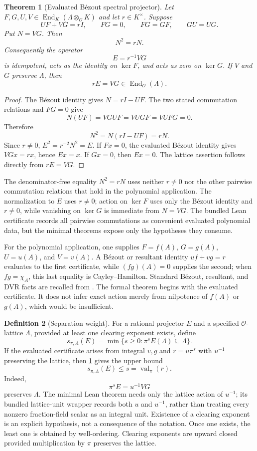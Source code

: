 \documentclass[11pt]{article}
\newtheorem{theorem}{Theorem}[section]
\theoremstyle{definition}
\newtheorem{definition}[theorem]{Definition}
\theoremstyle{remark}
\newcommand{\End}{\operatorname{End}}
\newcommand{\OO}{\mathcal O}
\newcommand{\val}{\operatorname{val}}
\begin{document}
\begin{theorem}[Evaluated B\'ezout spectral projector]\label{thm:bezout-projector}
Let $F,G,U,V\in\End_K(\Lambda\otimes_\OO K)$ and let $r\in K^\times$.
Suppose
\[
UF+VG=rI,
\qquad FG=0,
\qquad FG=GF,
\qquad GU=UG.
\]
Put $N=VG$. Then
\[
\boxed{N^2=rN.}
\]
Consequently the operator
\[
\boxed{
E=r^{-1}VG
}
\]
is idempotent, acts as the identity on $\ker F$, and acts as zero on
$\ker G$. If $V$ and $G$ preserve $\Lambda$, then
\[
rE=VG\in\End_\OO(\Lambda).
\]
\end{theorem}

\begin{proof}
The B\'ezout identity gives $N=rI-UF$. The two stated commutation relations
and $FG=0$ give
\[
N(UF)=VGUF=VUGF=VUFG=0.
\]
Therefore
\[
N^2=N(rI-UF)=rN.
\]
Since $r\ne0$, $E^2=r^{-2}N^2=E$. If $Fx=0$, the evaluated B\'ezout
identity gives $VGx=rx$, hence $Ex=x$. If $Gx=0$, then $Ex=0$.
The lattice assertion follows directly from $rE=VG$.
\end{proof}

The denominator-free equality $N^2=rN$ uses neither $r\ne0$ nor the other
pairwise commutation relations that hold in the polynomial application. The
normalization to $E$ uses $r\ne0$; action on $\ker F$ uses only the B\'ezout
identity and $r\ne0$, while vanishing on $\ker G$ is immediate from $N=VG$.
The bundled Lean certificate records all pairwise commutations as convenient
evaluated polynomial data, but the minimal theorems expose only the hypotheses
they consume.

For the polynomial application, one supplies $F=f(A)$, $G=g(A)$,
$U=u(A)$, and $V=v(A)$. A B\'ezout or resultant identity
$uf+vg=r$ evaluates to the first certificate, while
$(fg)(A)=0$ supplies the second; when $fg=\chi_A$, this last equality is
Cayley--Hamilton. Standard B\'ezout, resultant, and DVR facts are recalled
from \cite{lang2002,serre1979}. The formal theorem begins with the evaluated
certificate. It does not infer exact action merely from nilpotence of
$f(A)$ or $g(A)$, which would be insufficient.

\begin{definition}[Separation weight]\label{def:separation-weight}
For a rational projector $E$ and a specified $\OO$-lattice $\Lambda$, provided
at least one clearing exponent exists, define
\[
s_{\pi,\Lambda}(E)
=
\min\{s\ge0:\pi^sE(\Lambda)\subseteq\Lambda\}.
\]
If the evaluated certificate arises from integral $v,g$ and
$r=u\pi^s$ with $u^{-1}$ preserving the lattice, then
\cref{thm:bezout-projector} gives the upper bound
\[
s_{\pi,\Lambda}(E)\le s=\val_\pi(r).
\]
Indeed,
\[
\boxed{\pi^sE=u^{-1}VG}
\]
preserves $\Lambda$. The minimal Lean theorem needs only the lattice action of
$u^{-1}$; its bundled lattice-unit wrapper records both $u$ and $u^{-1}$,
rather than treating every nonzero fraction-field scalar as an integral unit.
Existence of a clearing exponent is an explicit hypothesis, not a consequence
of the notation. Once one exists, the least one is obtained by well-ordering.
Clearing exponents are upward closed provided multiplication by $\pi$
preserves the lattice.
\end{definition}
\end{document}

